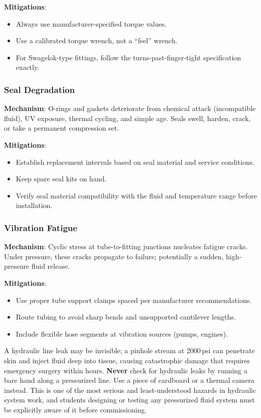 \documentclass[11pt,letterpaper,twoside,openany]{book}
\begin{document}
\textbf{Mitigations}:
\begin{itemize}[nosep,leftmargin=1.5em]
  \item Always use manufacturer-specified torque values.
  \item Use a calibrated torque wrench, not a ``feel'' wrench.
  \item For Swagelok-type fittings, follow the turns-past-finger-tight specification exactly.
\end{itemize}

\subsubsection{Seal Degradation}

\textbf{Mechanism}: O-rings and gaskets deteriorate from chemical attack (incompatible fluid), UV exposure, thermal cycling, and simple age. Seals swell, harden, crack, or take a permanent compression set.

\textbf{Mitigations}:
\begin{itemize}[nosep,leftmargin=1.5em]
  \item Establish replacement intervals based on seal material and service conditions.
  \item Keep spare seal kits on hand.
  \item Verify seal material compatibility with the fluid and temperature range before installation.
\end{itemize}

\subsubsection{Vibration Fatigue}

\textbf{Mechanism}: Cyclic stress at tube-to-fitting junctions nucleates fatigue cracks. Under pressure, these cracks propagate to failure; potentially a sudden, high-pressure fluid release.

\textbf{Mitigations}:
\begin{itemize}[nosep,leftmargin=1.5em]
  \item Use proper tube support clamps spaced per manufacturer recommendations.
  \item Route tubing to avoid sharp bends and unsupported cantilever lengths.
  \item Include flexible hose segments at vibration sources (pumps, engines).
\end{itemize}

\begin{warningbox}
A hydraulic line leak may be invisible; a pinhole stream at 2000\,psi can penetrate skin and inject fluid deep into tissue, causing catastrophic damage that requires emergency surgery within hours. \textbf{Never} check for hydraulic leaks by running a bare hand along a pressurized line. Use a piece of cardboard or a thermal camera instead. This is one of the most serious and least-understood hazards in hydraulic system work, and students designing or testing any pressurized fluid system must be explicitly aware of it before commissioning.
\end{warningbox}
\end{document}
